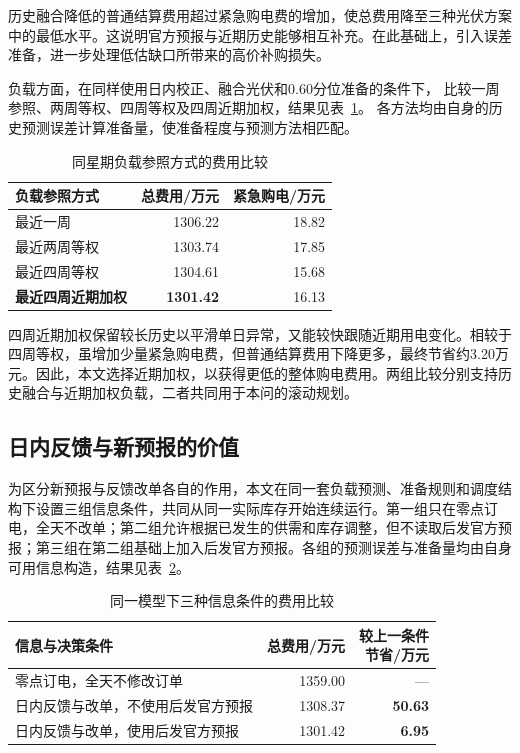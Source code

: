 历史融合降低的普通结算费用超过紧急购电费的增加，使总费用降至三种光伏方案中的最低水平。这说明官方预报与近期历史能够相互补充。在此基础上，引入误差准备，进一步处理低估缺口所带来的高价补购损失。

负载方面，在同样使用日内校正、融合光伏和0.60分位准备的条件下，
比较一周参照、两周等权、四周等权及四周近期加权，结果见表~\ref{tab:q3_load_compare}。
各方法均由自身的历史预测误差计算准备量，使准备程度与预测方法相匹配。

\begin{table}[!htbp]
\centering
\caption{同星期负载参照方式的费用比较}
\label{tab:q3_load_compare}
\begin{tabular}{lrr}
\toprule
负载参照方式 & 总费用/万元 & 紧急购电/万元\\
\midrule
最近一周 &1306.22&18.82\\
最近两周等权 &1303.74&17.85\\
最近四周等权 &1304.61&15.68\\
\textbf{最近四周近期加权} &\textbf{1301.42}&16.13\\
\bottomrule
\end{tabular}
\end{table}

四周近期加权保留较长历史以平滑单日异常，又能较快跟随近期用电变化。相较于四周等权，虽增加少量紧急购电费，但普通结算费用下降更多，最终节省约3.20万元。因此，本文选择近期加权，以获得更低的整体购电费用。两组比较分别支持历史融合与近期加权负载，二者共同用于本问的滚动规划。

\FloatBarrier
\subsection{日内反馈与新预报的价值}\label{sec:q3_information}

为区分新预报与反馈改单各自的作用，本文在同一套负载预测、准备规则和调度结构下设置三组信息条件，共同从同一实际库存开始连续运行。第一组只在零点订电，全天不改单；第二组允许根据已发生的供需和库存调整，但不读取后发官方预报；第三组在第二组基础上加入后发官方预报。各组的预测误差与准备量均由自身可用信息构造，结果见表~\ref{tab:q3_info}。

\begin{table}[H]
\centering
\caption{同一模型下三种信息条件的费用比较}
\label{tab:q3_info}
\begin{tabular}{p{}rr}
\toprule
信息与决策条件 & 总费用/万元 & \shortstack{较上一条件\\节省/万元}\\
\midrule
零点订电，全天不修改订单 &1359.00&---\\
日内反馈与改单，不使用后发官方预报 &1308.37&\textbf{50.63}\\
日内反馈与改单，使用后发官方预报 &1301.42&\textbf{6.95}\\
\bottomrule
\end{tabular}
\end{table}

